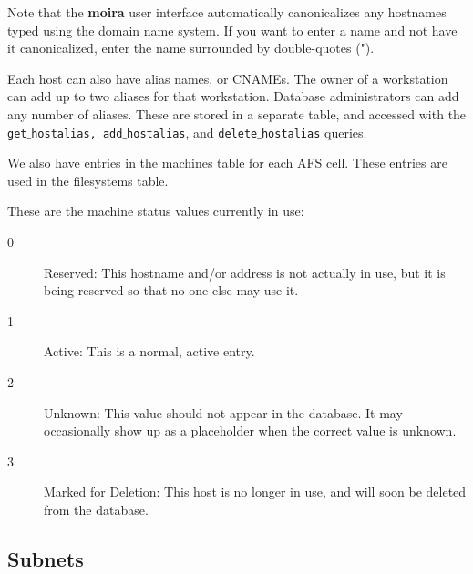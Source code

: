 Note that the {\bf moira} user interface automatically canonicalizes
any hostnames typed using the domain name system.  If you want to
enter a name and not have it canonicalized, enter the name surrounded
by double-quotes (").  

Each host can also have alias names, or CNAMEs.  The owner of a
workstation can add up to two aliases for that workstation.  Database
administrators can add any number of aliases.  These are stored in a
separate table, and accessed with the {\tt get$\_$hostalias,
add$\_$hostalias}, and {\tt delete$\_$hostalias} queries.

We also have entries in the machines table for each AFS cell.  These
entries are used in the filesystems table.

These are the machine status values currently in use:
\begin{description}
\item[0] Reserved: This hostname and/or address is not actually in
use, but it is being reserved so that no one else may use it.
\item[1] Active: This is a normal, active entry.
\item[2] Unknown: This value should not appear in the database.  It
may occasionally show up as a placeholder when the correct value is
unknown.
\item[3] Marked for Deletion: This host is no longer in use, and will
soon be deleted from the database.
\end{description}

\subsection{Subnets}

